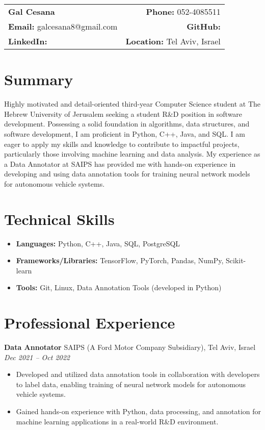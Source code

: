 \documentclass[a4paper,10pt]{article}
\makeatletter
\renewcommand{\maketitle}{
    \hspace{-1em}\begin{tabular*}{\textwidth}{l@{\extracolsep{\fill}}r}
        \textbf{\LARGE Gal Cesana} & \textbf{Phone:} 052-4085511 \\
        \textbf{Email:} galcesana8@gmail.com & \textbf{GitHub:} \\
        \textbf{LinkedIn:}  & \textbf{Location:} Tel Aviv, Israel \\
    \end{tabular*}
    \vspace{1em}
}
\makeatother
\begin{document}
\maketitle

\section*{Summary}
Highly motivated and detail-oriented third-year Computer Science student at The Hebrew University of Jerusalem seeking a student R\&D position in software development. Possessing a solid foundation in algorithms, data structures, and software development, I am proficient in Python, C++, Java, and SQL.  I am eager to apply my skills and knowledge to contribute to impactful projects, particularly those involving machine learning and data analysis.  My experience as a Data Annotator at SAIPS has provided me with hands-on experience in developing and using data annotation tools for training neural network models for autonomous vehicle systems. 

\section*{Technical Skills}
\begin{itemize}[noitemsep,nolistsep]
    \item \textbf{Languages:} Python, C++, Java, SQL, PostgreSQL
    \item \textbf{Frameworks/Libraries:} TensorFlow, PyTorch, Pandas, NumPy, Scikit-learn
    \item \textbf{Tools:} Git, Linux, Data Annotation Tools (developed in Python)
\end{itemize}

\section*{Professional Experience}
\textbf{Data Annotator} \hfill SAIPS (A Ford Motor Company Subsidiary), Tel Aviv, Israel \\
\textit{Dec 2021 -- Oct 2022}
\begin{itemize}[noitemsep,nolistsep]
    \item Developed and utilized data annotation tools in collaboration with developers to label data, enabling training of neural network models for autonomous vehicle systems.
    \item Gained hands-on experience with Python, data processing, and annotation for machine learning applications in a real-world R\&D environment.
\end{itemize}
\end{document}
